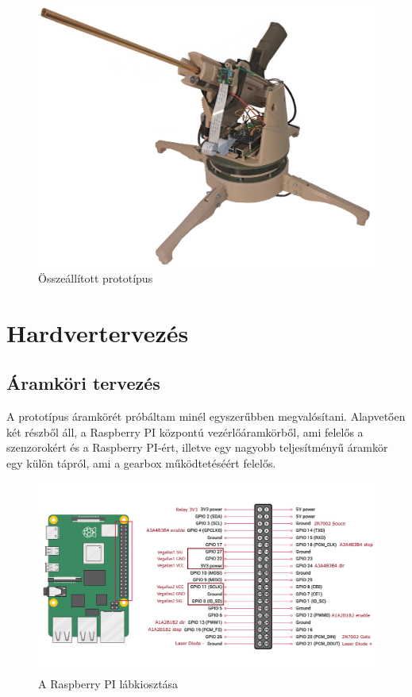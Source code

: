 \documentclass[12pt,a4paper]{article}
\begin{document}
\begin{figure}[h!]
	\centering
	\includegraphics[width=1\linewidth]{sentry1}
	\caption{Összeállított prototípus}
	\label{fig:sentry1}
\end{figure}

\pagebreak
\section{Hardvertervezés}

\subsection{Áramköri tervezés}
A prototípus áramkörét próbáltam minél egyszerűbben megvalósítani. Alapvetően két részből áll, a Raspberry PI központú vezérlőáramkörből, ami felelős a szenzorokért és a Raspberry PI-ért, illetve egy nagyobb teljesítményű áramkör egy külön tápról, ami a gearbox működtetéséért felelős.


\begin{figure}[h!]
	\centering
	\includegraphics[width=1\linewidth]{elek_pinout}
	\caption{A Raspberry PI lábkiosztása \cite{raspberry4}}
	\label{fig:elek_pinout}
\end{figure}
\end{document}
